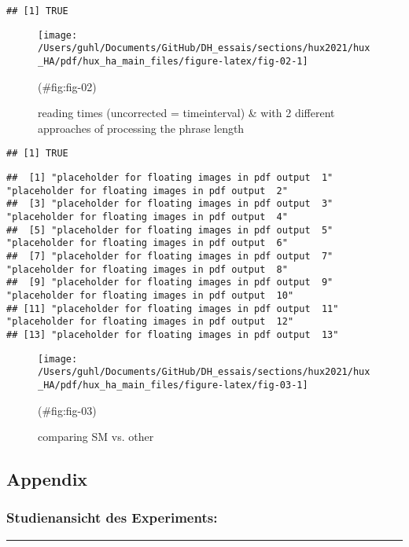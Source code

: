 \documentclass[
]{article}
\begin{document}
\begin{verbatim}
## [1] TRUE
\end{verbatim}

\begin{figure}[htpb]
\texttt{[image: /Users/guhl/Documents/GitHub/DH\_essais/sections/hux2021/hux\_HA/pdf/hux\_ha\_main\_files/figure-latex/fig-02-1]} \caption{reading times (uncorrected = timeinterval) & with 2 different approaches of processing the phrase length}(\#fig:fig-02)
\end{figure}

\begin{verbatim}
## [1] TRUE
\end{verbatim}

\begin{verbatim}
##  [1] "placeholder for floating images in pdf output  1"  "placeholder for floating images in pdf output  2" 
##  [3] "placeholder for floating images in pdf output  3"  "placeholder for floating images in pdf output  4" 
##  [5] "placeholder for floating images in pdf output  5"  "placeholder for floating images in pdf output  6" 
##  [7] "placeholder for floating images in pdf output  7"  "placeholder for floating images in pdf output  8" 
##  [9] "placeholder for floating images in pdf output  9"  "placeholder for floating images in pdf output  10"
## [11] "placeholder for floating images in pdf output  11" "placeholder for floating images in pdf output  12"
## [13] "placeholder for floating images in pdf output  13"
\end{verbatim}

\begin{figure}[htpb]
\texttt{[image: /Users/guhl/Documents/GitHub/DH\_essais/sections/hux2021/hux\_HA/pdf/hux\_ha\_main\_files/figure-latex/fig-03-1]} \caption{comparing SM vs. other}(\#fig:fig-03)
\end{figure}

\hypertarget{appendix}{%
\subsection{Appendix}\label{appendix}}

\hypertarget{studienansicht-des-experiments}{%
\subsubsection{Studienansicht des Experiments:}\label{studienansicht-des-experiments}}

\begin{center}\rule{0.5\linewidth}{0.5pt}\end{center}
\end{document}
